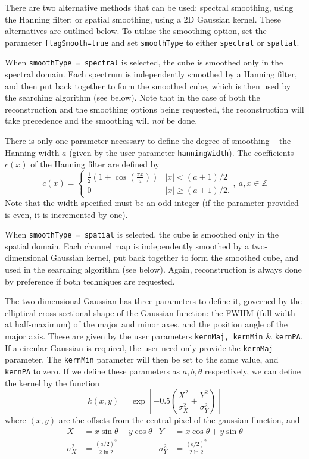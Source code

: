There are two alternative methods that can be used: spectral
smoothing, using the Hanning filter; or spatial smoothing, using a 2D
Gaussian kernel. These alternatives are outlined below. To utilise the
smoothing option, set the parameter \texttt{flagSmooth=true} and set
\texttt{smoothType} to either \texttt{spectral} or \texttt{spatial}.


When \texttt{smoothType = spectral} is selected, the cube is smoothed
only in the spectral domain. Each spectrum is independently smoothed
by a Hanning filter, and then put back together to form the smoothed
cube, which is then used by the searching algorithm (see below). Note
that in the case of both the reconstruction and the smoothing options
being requested, the reconstruction will take precedence and the
smoothing will \emph{not} be done.

There is only one parameter necessary to define the degree of
smoothing -- the Hanning width $a$ (given by the user parameter
\texttt{hanningWidth}). The coefficients $c(x)$ of the Hanning filter
are defined by
\[
c(x) = 
  \begin{cases}
   \frac{1}{2}\left(1+\cos(\frac{\pi x}{a})\right) &|x| < (a+1)/2\\
   0                                               &|x| \geq (a+1)/2.
  \end{cases},\ a,x \in \mathbb{Z}
\]
Note that the width specified must be an
odd integer (if the parameter provided is even, it is incremented by
one).


When \texttt{smoothType = spatial} is selected, the cube is smoothed
only in the spatial domain. Each channel map is independently smoothed
by a two-dimensional Gaussian kernel, put back together to form the
smoothed cube, and used in the searching algorithm (see below). Again,
reconstruction is always done by preference if both techniques are
requested.

The two-dimensional Gaussian has three parameters to define it,
governed by the elliptical cross-sectional shape of the Gaussian
function: the FWHM (full-width at half-maximum) of the major and minor
axes, and the position angle of the major axis. These are given by the
user parameters \texttt{kernMaj, kernMin} \& \texttt{kernPA}. If a
circular Gaussian is required, the user need only provide the
\texttt{kernMaj} parameter. The \texttt{kernMin} parameter will then
be set to the same value, and \texttt{kernPA} to zero.  If we define
these parameters as $a,b,\theta$ respectively, we can define the
kernel by the function
\[ 
k(x,y) = \exp\left[-0.5 \left(\frac{X^2}{\sigma_X^2} + 
                              \frac{Y^2}{\sigma_Y^2}   \right) \right] 
\]
where $(x,y)$ are the offsets from the central pixel of the gaussian
function, and 
\begin{align*}
X& = x\sin\theta - y\cos\theta&
  Y&= x\cos\theta + y\sin\theta\\
\sigma_X^2& = \frac{(a/2)^2}{2\ln2}&
  \sigma_Y^2& = \frac{(b/2)^2}{2\ln2}\\
\end{align*}

